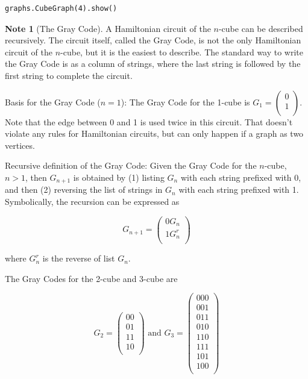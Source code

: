 \documentclass[10pt,]{book}
\theoremstyle{plain}
\theoremstyle{definition}
\theoremstyle{definition}
\newtheorem{note}[theorem]{Note}
\theoremstyle{definition}
\theoremstyle{definition}
\theoremstyle{definition}
\numberwithin{equation}{section}
\begin{document}
\begin{lstlisting}[style=sageinput]
graphs.CubeGraph(4).show()
\end{lstlisting}
\begin{note}[The Gray Code]\label{note-gray-code}
 A Hamiltonian circuit of the \(n\)-cube can be described recursively. The circuit itself, called the Gray Code, is
not the only Hamiltonian circuit of the \(n\)-cube, but it is the easiest to describe. The standard way to write the Gray Code is as a column of strings, where the last string is followed by the first string to complete the circuit.%
\par
Basis for the Gray Code (\(n = 1\)): The Gray Code for the 1-cube is \(G_1=\left(
\begin{array}{c}
 0 \\
 1 \\
\end{array}
\right)\).  Note that the edge between 0 and 1 is used twice in this circuit. That doesn't violate any rules for Hamiltonian circuits, but
can only happen if a graph as two vertices.%
\par
Recursive definition of the Gray Code: Given the Gray Code for the \(n\)-cube, \(n > 1\), then \(G_{n+1}\) is obtained by (1) listing \(G_n\) with each string prefixed
with 0, and then (2) reversing the list of strings in \(G_n\) with each string prefixed with 1. Symbolically, the recursion can
be expressed as



\[G_{n+1}=\left(
\begin{array}{c}
 0 G_n \\
 1 G_n^r \\
\end{array}
\right)\]



where \(G_n^r\) is the reverse of list \(G_n\).%
\par
The Gray Codes for the 2-cube and 3-cube are

\[G_2= \left(
\begin{array}{c}
 00 \\
 01 \\
 11 \\
 10 \\
\end{array}
\right) \textrm{  and   }G_3=\left(
\begin{array}{c}
 000 \\
 001 \\
 011 \\
 010 \\
 110 \\
 111 \\
 101 \\
 100 \\
\end{array}
\right)\]
%
\end{note}
\end{document}
